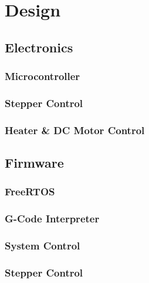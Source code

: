 \chapter{Design}
	
	\section{Electronics}
		
		\subsection{Microcontroller}
		
		\subsection{Stepper Control}
		
		\subsection{Heater \& DC Motor Control}
	
	\section{Firmware}
		
		\subsection{FreeRTOS}
		
		\subsection{\uIP}
		
		\subsection{G-Code Interpreter}
		
		\subsection{System Control}
		
		\subsection{Stepper Control}
